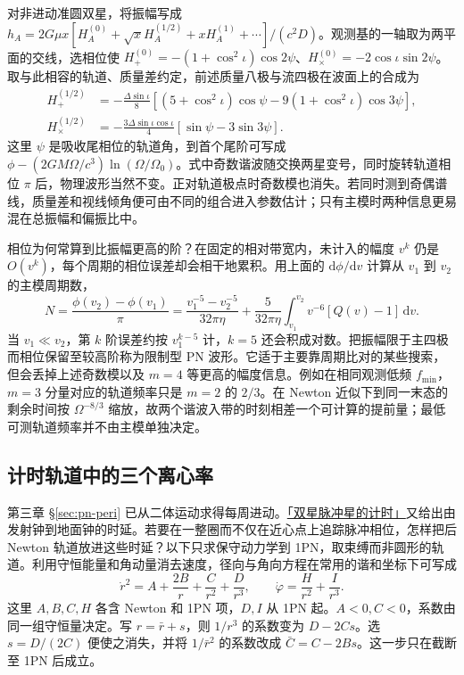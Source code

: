 对非进动准圆双星，将振幅写成 $h_A=2G\mu x[H_A^{(0)}+\sqrt x H_A^{(1/2)}+x H_A^{(1)}+\cdots]/(c^2D)$。观测基的一轴取为两平面的交线，选相位使 $H_+^{(0)}=-(1+\cos^2\iota)\cos2\psi$、$H_\times^{(0)}=-2\cos\iota\sin2\psi$。取与此相容的轨道、质量差约定，前述质量八极与流四极在波面上的合成为
\begin{align*}
 H_+^{(1/2)}&=-\frac{\Delta\sin\iota}{8}
     [(5+\cos^2\iota)\cos\psi-9(1+\cos^2\iota)\cos3\psi],\\
 H_\times^{(1/2)}&=-\frac{3\Delta\sin\iota\cos\iota}{4}
         [\sin\psi-3\sin3\psi].
\end{align*}
这里 $\psi$ 是吸收尾相位的轨道角，到首个尾阶可写成 $\phi-(2GM\Omega/c^3)\ln(\Omega/\Omega_0)$。式中奇数谐波随交换两星变号，同时旋转轨道相位 $\pi$ 后，物理波形当然不变。正对轨道极点时奇数模也消失。若同时测到奇偶谱线，质量差和视线倾角便可由不同的组合进入参数估计；只有主模时两种信息更易混在总振幅和偏振比中。

相位为何常算到比振幅更高的阶？在固定的相对带宽内，未计入的幅度 $v^k$ 仍是 $O(v^k)$，每个周期的相位误差却会相干地累积。用上面的 $\mathrm d\phi/\mathrm dv$ 计算从 $v_1$ 到 $v_2$ 的主模周期数，
\[
 N=\frac{\phi(v_2)-\phi(v_1)}{\pi}
   =\frac{v_1^{-5}-v_2^{-5}}{32\pi\eta}
   +\frac{5}{32\pi\eta}\int_{v_1}^{v_2}
                        v^{-6}[Q(v)-1]\,\mathrm dv .
\]
当 $v_1\ll v_2$，第 $k$ 阶误差约按 $v_1^{k-5}$ 计，$k=5$ 还会积成对数。把振幅限于主四极而相位保留至较高阶称为限制型 PN 波形。它适于主要靠周期比对的某些搜索，但会丢掉上述奇数模以及 $m=4$ 等更高的幅度信息。例如在相同观测低频 $f_{\min}$，$m=3$ 分量对应的轨道频率只是 $m=2$ 的 $2/3$。在 Newton 近似下到同一末态的剩余时间按 $\Omega^{-8/3}$ 缩放，故两个谐波入带的时刻相差一个可计算的提前量；最低可测轨道频率并不由主模单独决定。

\subsection{计时轨道中的三个离心率}\label{sec:gw-b-timing}
第三章 \S\ref{sec:pn-peri} 已从二体运动求得每周进动。\hyperlink{subsection.3.13.1}{「双星脉冲星的计时」}又给出由发射钟到地面钟的时延。若要在一整圈而不仅在近心点上追踪脉冲相位，怎样把后 Newton 轨道放进这些时延？以下只求保守动力学到 1PN，取束缚而非圆形的轨道。利用守恒能量和角动量消去速度，径向与角向方程在常用的谐和坐标下可写成
\[
 \dot r^2=A+\frac{2B}{r}+\frac{C}{r^2}+\frac{D}{r^3},
 \qquad \dot\varphi=\frac{H}{r^2}+\frac{I}{r^3}.
\]
这里 $A,B,C,H$ 各含 Newton 和 1PN 项，$D,I$ 从 1PN 起。$A<0,C<0$，系数由同一组守恒量决定。写 $r=\bar r+s$，则 $1/r^3$ 的系数变为 $D-2Cs$。选 $s=D/(2C)$ 便使之消失，并将 $1/\bar r^2$ 的系数改成 $\bar C=C-2Bs$。这一步只在截断至 1PN 后成立。

